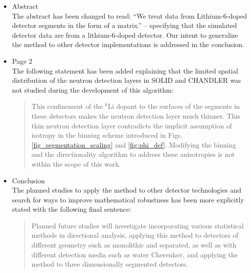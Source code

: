 \begin{itemize}
    \item Abstract \\ The abstract has been changed to read: ``We treat data from Lithium-6-doped detector segments in the form of a matrix.'' -- specifying that the simulated detector data are from a lithium-6-doped detector. Our intent to generalize the method to other detector implementations is addressed in the conclusion.
    \item Page 2 \\ The following statement has been added explaining that the limited spatial distribution of the neutron detection layers in SOLID and CHANDLER was not studied during the development of this algorithm: \\
    \begin{quote}
         This confinement of the ${}^6$Li dopant to the surfaces of the segments in these detectors makes the neutron detection layer much thinner. This thin neutron detection layer contradicts the implicit assumption of isotropy in the binning scheme introduced in Figs. \ref{fig_segmentation_scaling} and \ref{fig:phi_def}. Modifying the binning and the directionality algorithm to address these anisotropies is not within the scope of this work.
    \end{quote}
    \item Conclusion \\ The planned studies to apply the method to other detector technologies and search for ways to improve mathematical robustness has been more explicitly stated with the following final sentence: \\
    \begin{quote}
        Planned future studies will investigate incorporating various statistical methods in directional analysis, applying this method to detectors of different geometry such as monolithic and separated, as well as with different detection media such as water Cherenkov, and applying the method to three dimensionally segmented detectors. 
    \end{quote}
\end{itemize}
